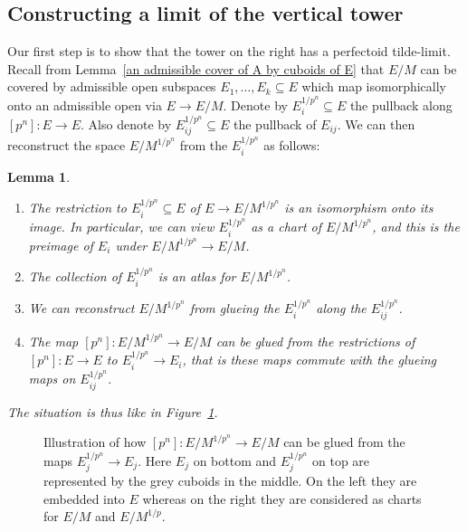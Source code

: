 \documentclass[10pt,oneside]{amsart}
\newtheorem{lemma}[theorem]{Lemma}
\theoremstyle{definition}
\begin{document}
		\subsection{Constructing a limit of the vertical tower}
		
		Our first step is to show that the tower on the right has a perfectoid tilde-limit.
		Recall from Lemma~\ref{an admissible cover of A by cuboids of E} that $E/M$ can be covered by admissible open subspaces $E_1,\dots,E_k\subseteq E$ which map isomorphically onto an admissible open via $E\to E/M$. Denote by $E_i^{1/p^n}\subseteq E$ the pullback along $[p^n]:E\rightarrow E$. Also denote by $E_{ij}^{1/p^n}\subseteq E$ the pullback of $E_{ij}$. We can then reconstruct the space $E/M^{1/p^n}$ from the $E_i^{1/p^n}$ as follows:
		\begin{lemma}\label{compatible cuboid charts for the tower over E/M}
			\leavevmode
			\begin{enumerate}
		\item The restriction to $E_{i}^{1/p^n}\subseteq E$ of $E\rightarrow E/M^{1/p^n}$ is an isomorphism onto its image. In particular, we can view $E_{i}^{1/p^n}$ as a chart of $E/M^{1/p^n}$, and this is the preimage of $E_i$ under $E/M^{1/p^n}\rightarrow E/M$.
		\item The collection of  $E_{i}^{1/p^n}$ is an atlas for  $E/M^{1/p^n}$. 
		\item We can reconstruct $E/M^{1/p^n}$ from glueing the $E_{i}^{1/p^n}$ along the $E_{ij}^{1/p^n}$.
		\item The map $[p^n]:E/M^{1/p^n}\rightarrow E/M$ can be glued from the restrictions of $[p^n]:E\rightarrow E$ to $E_{i}^{1/p^n}\rightarrow E_{i}$, that is these maps commute with the glueing maps on $E_{ij}^{1/p^n}$.
		\end{enumerate}
		The situation is thus like in Figure~\ref{transform-glue-cover-tikzpicture}.
		\end{lemma}
			\begin{figure}
				
				\caption{Illustration of how $[p^n]:E/M^{1/p^n}\rightarrow E/M$ can be glued from the maps $E_j^{1/p^n}\rightarrow E_j$. Here $E_j$ on bottom and $E_j^{1/p^n}$ on top are represented by the grey cuboids in the middle. On the left they are embedded into $E$ whereas on the right they are considered as charts for $E/M$ and $E/M^{1/p}$.}
				\label{transform-glue-cover-tikzpicture}
			\end{figure}
\end{document}
